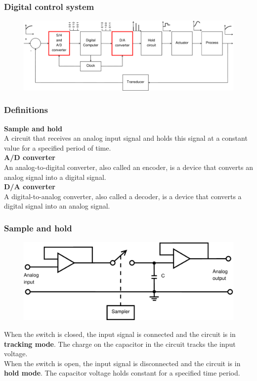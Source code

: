 \begin{frame}
	\frametitle{Digital control system}
	\begin{figure}
		\includegraphics[width=1\textwidth]{digital_control_system}
	\end{figure}
\end{frame}

\begin{frame}
	\frametitle{Definitions}
	\textbf{Sample and hold}\\
	A circuit that receives an analog input signal and holds this signal at a constant value for a specified period of time.\\
	\medskip
	\textbf{A/D converter}\\
	An analog-to-digital converter, also called an encoder, is a device that converts an analog signal into a digital signal.\\
	\medskip 
	\textbf{D/A converter}\\
	A digital-to-analog converter, also called a decoder, is a device that converts a digital signal into an analog signal.
\end{frame}

\begin{frame}
	\frametitle{Sample and hold}
	\begin{figure}
		\includegraphics[width=0.8\linewidth]{sample_hold}
	\end{figure}
	\vspace{-2ex}
	When the switch is closed, the input signal is connected and the circuit is in \textbf{tracking mode}. The charge on the capacitor in the circuit tracks the input voltage.\\
	When the switch is open, the input signal is disconnected and the circuit is in \textbf{hold mode}. The capacitor voltage holds constant for a specified time period.
\end{frame}

